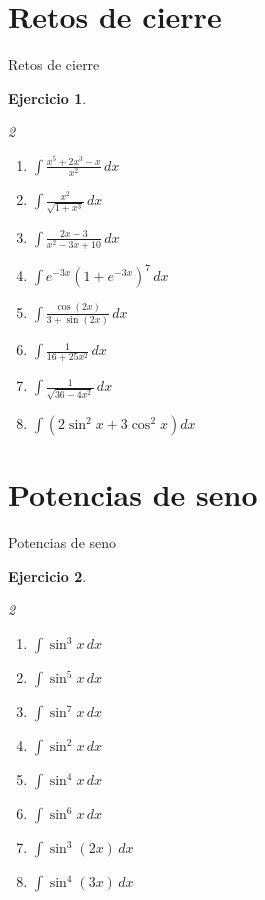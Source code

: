 \documentclass[10pt,aspectratio=169]{beamer}
\newtheorem{Ejer}{Ejercicio}
\begin{document}
\section{Retos de cierre}
\begin{frame}{Retos de cierre}
\begin{Ejer}
\begin{multicols}{2}
\begin{enumerate}
\item $\displaystyle \int\frac{x^5+2x^3-x}{x^2}\,dx$
\item $\displaystyle \int\frac{x^2}{\sqrt{1+x^3}}\,dx$
\item $\displaystyle \int\frac{2x-3}{x^2-3x+10}\,dx$
\item $\displaystyle \int e^{-3x}(1+e^{-3x})^7\,dx$
\item $\displaystyle \int\frac{\cos(2x)}{3+\sin(2x)}\,dx$
\item $\displaystyle \int\frac{1}{16+25x^2}\,dx$
\item $\displaystyle \int\frac{1}{\sqrt{36-4x^2}}\,dx$
\item $\displaystyle \int\left(2\sin^2x+3\cos^2x\right)dx$
\end{enumerate}
\end{multicols}
\end{Ejer}

\end{frame}


\section{Potencias de seno}
\begin{frame}{Potencias de seno}
\begin{Ejer}
\begin{multicols}{2}
\begin{enumerate}
\item $\displaystyle \int \sin^3 x\,dx$
\item $\displaystyle \int \sin^5 x\,dx$
\item $\displaystyle \int \sin^7 x\,dx$
\item $\displaystyle \int \sin^2 x\,dx$
\item $\displaystyle \int \sin^4 x\,dx$
\item $\displaystyle \int \sin^6 x\,dx$
\item $\displaystyle \int \sin^3(2x)\,dx$
\item $\displaystyle \int \sin^4(3x)\,dx$
\end{enumerate}
\end{multicols}
\end{Ejer}

\end{frame}
\end{document}
